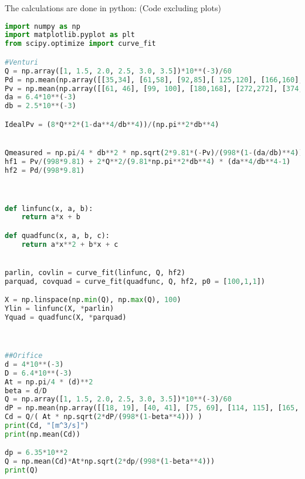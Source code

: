 The calculations are done in python: (Code excluding plots)
\begin{lstlisting}[language = Python, caption = Python code]
import numpy as np
import matplotlib.pyplot as plt
from scipy.optimize import curve_fit

#Venturi
Q = np.array([1, 1.5, 2.0, 2.5, 3.0, 3.5])*10**(-3)/60
Pd = np.mean(np.array([[35,34], [61,58], [92,85],[ 125,120], [166,160], [209,204]])*10**2, axis = 1)
Pv = np.mean(np.array([[61, 46], [99, 100], [180,168], [272,272], [374,390], [493, 500]])*10**2, axis = 1)
da = 6.4*10**(-3)
db = 2.5*10**(-3)

IdealPv = (8*Q**2*(1-da**4/db**4))/(np.pi**2*db**4)


Qmeasured = np.pi/4 * db**2 * np.sqrt(2*9.81*(-Pv)/(998*(1-(da/db)**4)))
hf1 = Pv/(998*9.81) + 2*Q**2/(9.81*np.pi**2*db**4) * (da**4/db**4-1)
hf2 = Pd/(998*9.81)



def linfunc(x, a, b):
    return a*x + b

def quadfunc(x, a, b, c):
    return a*x**2 + b*x + c


parlin, covlin = curve_fit(linfunc, Q, hf2)
parquad, covquad = curve_fit(quadfunc, Q, hf2, p0 = [100,1,1])

X = np.linspace(np.min(Q), np.max(Q), 100)
Ylin = linfunc(X, *parlin)
Yquad = quadfunc(X, *parquad)



##Orifice
d = 4*10**(-3)
D = 6.4*10**(-3)    
At = np.pi/4 * (d)**2
beta = d/D
Q = np.array([1, 1.5, 2.0, 2.5, 3.0, 3.5])*10**(-3)/60
dP = np.mean(np.array([[18, 19], [40, 41], [75, 69], [114, 115], [165, 166], [232, 235]])*10**2, axis = 1)
Cd = Q/( At * np.sqrt(2*dP/(998*(1-beta**4))) )
print(Cd, "[m^3/s]")
print(np.mean(Cd))

dp = 6.35*10**2
Q = np.mean(Cd)*At*np.sqrt(2*dp/(998*(1-beta**4)))
print(Q)
\end{lstlisting}